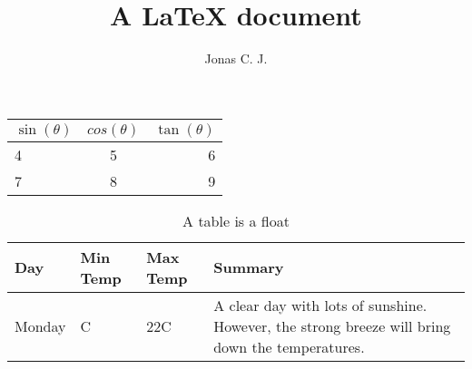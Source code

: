 \documentclass[a4paper, 12pt]{article}
\title{A \LaTeX{} document}
\author{Jonas C. J.}
\begin{document}
\begin{tabular}{|l|c|r|}
	\hline
	$\sin(\theta)$ & $cos(\theta)$ & $\tan(\theta)$ \\ \hline
	4 & 5 & 6 \\ \hline
	7 & 8 & 9 \\ \hline
\end{tabular}

\begin{table}
\begin{center}
\begin{tabular}{ | l | l | l | p{5cm} |}
    \hline
    Day & Min Temp & Max Temp & Summary \\ \hline
    Monday & C & 22C & A clear day with lots of sunshine.  
    However, the strong breeze will bring down the temperatures. \\ \hline
\end{tabular}
\end{center}
\caption{A table is a float}
\end{table}
\end{document}
